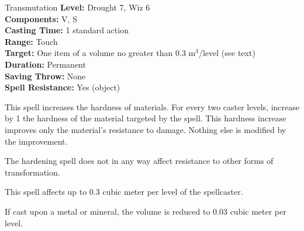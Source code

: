 {Transmutation}
{
	\textbf{Level:} Drought 7, Wiz 6\\	
	\textbf{Components:} V, S\\	
	\textbf{Casting Time:} 1 standard action\\	
	\textbf{Range:} Touch\\	
	\textbf{Target:} One item of a volume no greater than 0.3 m$^3$/level (see text)\\	
	\textbf{Duration:} Permanent\\	
	\textbf{Saving Throw:} None\\	
	\textbf{Spell Resistance:} Yes (object)\\
}
{
	This spell increases the hardness of materials. For every two caster levels, increase by 1 the hardness of the material targeted by the spell. This hardness increase improves only the material's resistance to damage. Nothing else is modified by the improvement.

	The hardening spell does not in any way affect resistance to other forms of transformation.

	This spell affects up to 0.3 cubic meter per level of the spellcaster.

	If cast upon a metal or mineral, the volume is reduced to 0.03 cubic meter per level.
}
